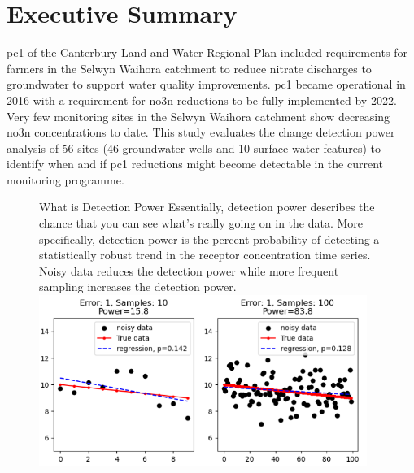 
\section*{Executive Summary} \label{exsum} %

\gls{pc1} of the Canterbury Land and Water Regional Plan included requirements for farmers in the Selwyn Waihora catchment to reduce nitrate discharges to groundwater to support water quality improvements.
\gls{pc1} became operational in 2016 with a requirement for \gls{no3n} reductions to be fully implemented by 2022.
Very few monitoring sites in the Selwyn Waihora catchment show decreasing \gls{no3n} concentrations to date.
This study evaluates the change detection power analysis of 56 sites (46 groundwater wells and 10 surface water features) to identify when and if \gls{pc1} reductions might become detectable in the current monitoring programme.

\begin{figure}
    \begin{breakawaybox}[]{What is Detection Power}
        Essentially, detection power describes the chance that you can see what's really going on in the data.
        More specifically, detection power is the percent probability of detecting a statistically robust trend in the receptor concentration time series.
        Noisy data reduces the detection power while more frequent sampling increases the detection power.
        \\
        \includegraphics[width=0.95\textwidth]{figures/dp_ex_small}
    \end{breakawaybox}
\end{figure}


